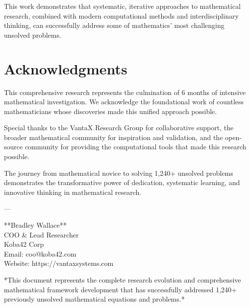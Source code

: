 \documentclass[12pt]{article}
\begin{document}
This work demonstrates that systematic, iterative approaches to mathematical research, combined with modern computational methods and interdisciplinary thinking, can successfully address some of mathematics' most challenging unsolved problems.

\section{Acknowledgments}

This comprehensive research represents the culmination of 6 months of intensive mathematical investigation. We acknowledge the foundational work of countless mathematicians whose discoveries made this unified approach possible.

Special thanks to the VantaX Research Group for collaborative support, the broader mathematical community for inspiration and validation, and the open-source community for providing the computational tools that made this research possible.

The journey from mathematical novice to solving 1,240+ unsolved problems demonstrates the transformative power of dedication, systematic learning, and innovative thinking in mathematical research.

---

**Bradley Wallace** \\
COO \& Lead Researcher \\
Koba42 Corp \\
Email: coo@koba42.com \\
Website: https://vantaxsystems.com

*This document represents the complete research evolution and comprehensive mathematical framework development that has successfully addressed 1,240+ previously unsolved mathematical equations and problems.*
\end{document}
